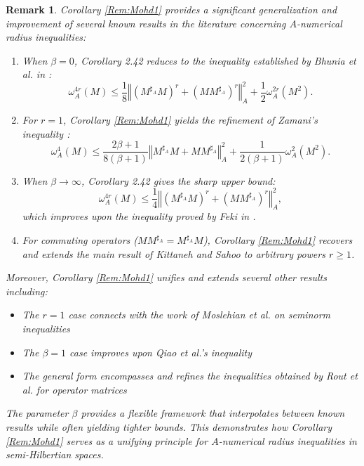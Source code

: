 \documentclass{article}
\newcommand{\bra}[1]{\left(#1\right)}
\newcommand{\normA}[1]{{\left\Vert#1\right\Vert}_{A}}
\newcommand {\Ma}{M^{\sharp_{A}}}
\newtheorem{remark}[theorem]{Remark}
\begin{document}
\begin{remark}
Corollary \ref{Rem:Mohd1} provides a significant generalization and improvement of several known results in the literature concerning $A$-numerical radius inequalities:

\begin{enumerate}
    \item When $\beta = 0$, Corollary 2.42 reduces to the inequality established by Bhunia et al. in \cite[Corollary 2.10]{BPN}:
    \[
    \omega_A^{4r}(M) \leq \frac{1}{8}\normA{\bra{\Ma M}^r + \bra{M\Ma}^r}^2 + \frac{1}{2}\omega_A^{2r}(M^2).
    \]

    \item For $r = 1$, Corollary \ref{Rem:Mohd1}  yields the refinement of Zamani's inequality \cite[Theorem 2.11]{Zamani-2}:
    \[
    \omega_A^{4}(M) \leq \frac{2\beta+1}{8(\beta+1)}\normA{\Ma M + M\Ma}^2 + \frac{1}{2(\beta+1)}\omega_A^{2}(M^2).
    \]

    \item When $\beta \to \infty$, Corollary 2.42 gives the sharp upper bound:
    \[
    \omega_A^{4r}(M) \leq \frac{1}{4}\normA{\bra{\Ma M}^r + \bra{M\Ma}^r}^2,
    \]
    which improves upon the inequality proved by Feki in \cite[Theorem 2.7]{Feki-2}.

    \item For commuting operators ($M\Ma = \Ma M$), Corollary \ref{Rem:Mohd1}  recovers and extends the main result of Kittaneh and Sahoo \cite[Theorem 3.1]{Kit.1} to arbitrary powers $r \geq 1$.
\end{enumerate}

Moreover, Corollary \ref{Rem:Mohd1} unifies and extends several other results including:
\begin{itemize}
    \item The $r=1$ case connects with the work of Moslehian et al. \cite{MXZ} on seminorm inequalities
    \item The $\beta=1$ case improves upon Qiao et al.'s inequality \cite[Theorem 3.4]{QHC}
    \item The general form encompasses and refines the inequalities obtained by Rout et al. \cite{RSM} for operator matrices
\end{itemize}

The parameter $\beta$ provides a flexible framework that interpolates between known results while often yielding tighter bounds. This demonstrates how Corollary \ref{Rem:Mohd1}  serves as a unifying principle for $A$-numerical radius inequalities in semi-Hilbertian spaces.
\end{remark}
\end{document}
